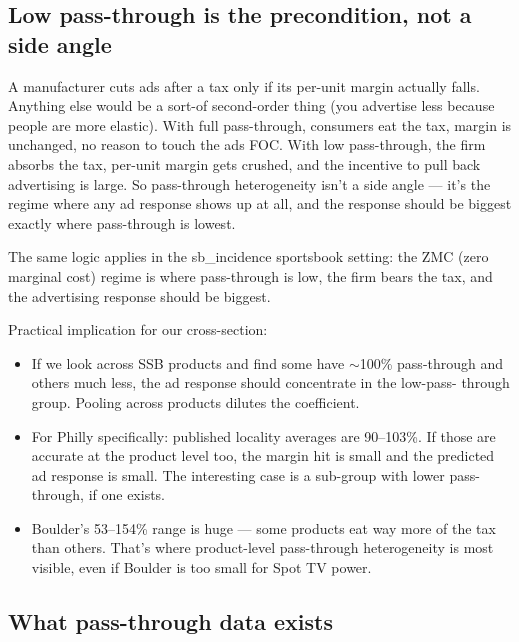 \subsection*{Low pass-through is the precondition, not a
  side angle}

A manufacturer cuts ads after a tax only if its per-unit
margin actually falls. Anything else would be a sort-of second-order thing (you advertise less because people are more elastic). With full pass-through, consumers
eat the tax, margin is unchanged, no reason to touch the
ads FOC. With low pass-through, the firm absorbs the tax,
per-unit margin gets crushed, and the incentive to pull
back advertising is large. So pass-through heterogeneity
isn't a side angle --- it's the regime where any ad
response shows up at all, and the response should be
biggest exactly where pass-through is lowest.

The same logic applies in the sb\_incidence sportsbook
setting: the ZMC (zero marginal cost) regime is where
pass-through is low, the firm bears the tax, and the
advertising response should be biggest.

Practical implication for our cross-section:
\begin{itemize}
  \item If we look across SSB products and find some have
        $\sim$100\% pass-through and others much less, the
        ad response should concentrate in the low-pass-
        through group. Pooling across products dilutes the
        coefficient.
  \item For Philly specifically: published locality
        averages are 90--103\%. If those are accurate at
        the product level too, the margin hit is small and
        the predicted ad response is small. The interesting
        case is a sub-group with lower pass-through, if
        one exists.
  \item Boulder's 53--154\% range is huge --- some products
        eat way more of the tax than others. That's where
        product-level pass-through heterogeneity is most
        visible, even if Boulder is too small for Spot TV
        power.
\end{itemize}

\subsection*{What pass-through data exists}


